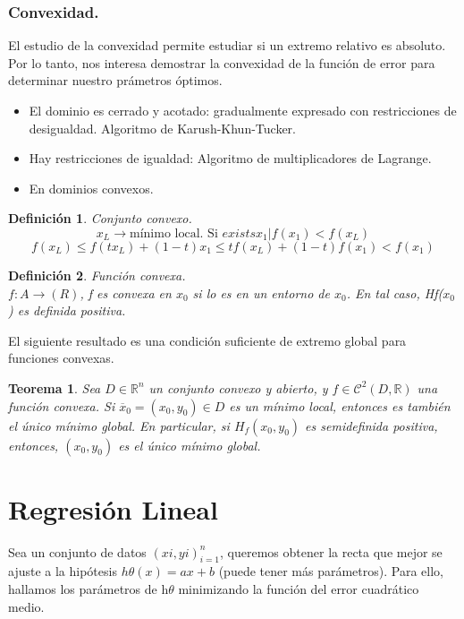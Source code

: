 \documentclass[a4paper,10pt]{article}
\newtheorem{theorem}{Teorema}
\newtheorem{definition}{Definición}
\begin{document}
\subsubsection{Convexidad.}

El estudio de la convexidad permite estudiar si un extremo relativo es absoluto. Por lo tanto, nos interesa demostrar la convexidad de la función de error para determinar nuestro prámetros óptimos.

\begin{itemize}
\item El dominio es cerrado y acotado: gradualmente expresado con restricciones de desigualdad. Algoritmo de Karush-Khun-Tucker.
\item Hay restricciones de igualdad: Algoritmo de multiplicadores de Lagrange.
\item En dominios convexos.
\end{itemize}
\begin{definition} Conjunto convexo. \\
\[x_{L} \rightarrow \text{mínimo local. Si } exists x_{1} |  f(x_{1}) < f(x_{L})\]
\[f(x_{L})\leq f(tx_{L})+(1-t)x_{1}\leq tf(x_{L})+(1-t)f(x_{1})<f(x_{1})\]
\end{definition}
\begin{definition} Función convexa. \\
$\textit{f}: \textit{A}\rightarrow (R)$, \textit{f} es convexa en $x_{0}$ si lo es en un entorno de $x_{0}$. En tal caso, \textit{Hf($x_{0}$)} es definida positiva.
\end{definition}
El siguiente resultado es una condición suficiente de extremo global para funciones convexas.
\begin{theorem}
Sea $D\in\mathbb{R}^n$ un conjunto convexo y abierto, y $f\in\mathcal{C}^2(D,\mathbb{R})$ una función convexa. Si $\overline{x}_0=(x_0,y_0)\in D$ es un mínimo local, entonces es también el único mínimo global. En particular, si $H_f(x_0,y_0)$ es semidefinida positiva, entonces, $(x_0,y_0)$ es el único mínimo global.
\end{theorem}
\section{Regresión Lineal}

Sea un conjunto de datos $(xi,yi)^n_{i=1}$, queremos obtener la recta  que mejor se ajuste a la hipótesis $h\theta(x)= ax+b$ (puede tener  más parámetros). Para ello, hallamos los parámetros de h$\theta$  minimizando la función del error cuadrático medio.
\end{document}
